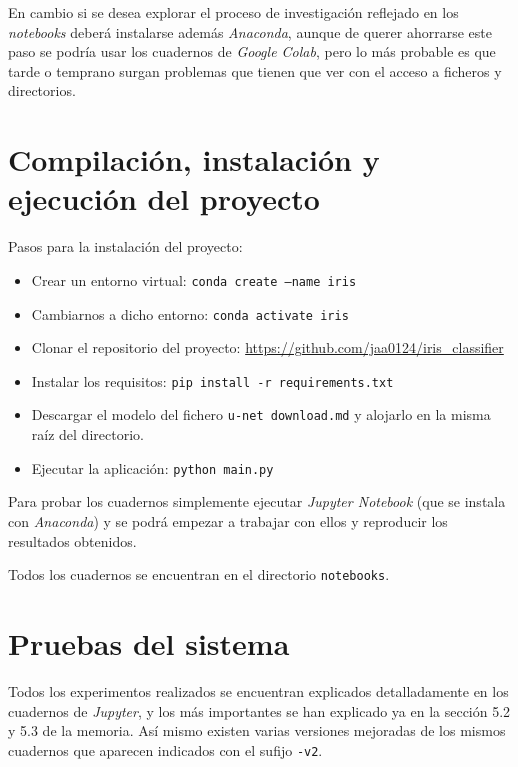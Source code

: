 En cambio si se desea explorar el proceso de investigación reflejado en los \emph{notebooks} deberá instalarse además \emph{Anaconda}, aunque de querer ahorrarse este paso se podría usar los cuadernos de \emph{Google Colab}, pero lo más probable es que tarde o temprano surgan problemas que tienen que ver con el acceso a ficheros y directorios.


\section{Compilación, instalación y ejecución del proyecto} \label{pasos}

Pasos para la instalación del proyecto:
\begin{itemize}

    \item Crear un entorno virtual: \texttt{conda create --name iris}
    \item Cambiarnos a dicho entorno: \texttt{conda activate iris}
    \item Clonar el repositorio del proyecto: \url{https://github.com/jaa0124/iris_classifier}
    \item Instalar los requisitos: \texttt{pip install -r requirements.txt}
    \item Descargar el modelo del fichero \texttt{u-net download.md} y alojarlo en la misma raíz del directorio.
    \item Ejecutar la aplicación: \texttt{python main.py}
\end{itemize}

Para probar los cuadernos simplemente ejecutar \emph{Jupyter Notebook} (que se instala con \emph{Anaconda}) y se podrá empezar a trabajar con ellos y reproducir los resultados obtenidos.

Todos los cuadernos se encuentran en el directorio \texttt{notebooks}.

\section{Pruebas del sistema}
Todos los experimentos realizados se encuentran explicados detalladamente en los cuadernos de \emph{Jupyter}, y los más importantes se han explicado ya en la sección 5.2 y 5.3 de la memoria. Así mismo existen varias versiones mejoradas de los mismos cuadernos que aparecen indicados con el sufijo \texttt{-v2}.